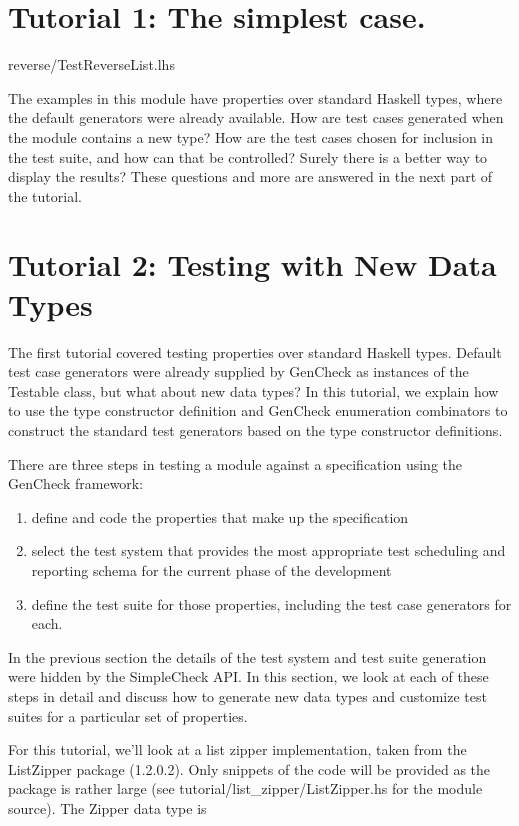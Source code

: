 \section{Tutorial 1: The simplest case.}

 {reverse/TestReverseList.lhs}

The examples in this module have properties over standard Haskell types, where
the default generators were already available.  How are test cases generated
when the module contains a new type?  How are the test cases chosen for
inclusion in the test suite, and how can that be controlled?  Surely there is
a better way to display the results?  These questions and more are answered
in the next part of the tutorial.  

\section{Tutorial 2: Testing with New Data Types}

The first tutorial covered testing properties over standard Haskell types.
Default test case generators were already supplied by GenCheck
as instances of the Testable class, but what about new data types?
In this tutorial, we explain how to use the type constructor definition and 
GenCheck enumeration combinators to construct the standard test generators
based on the type constructor definitions.

There are three steps in testing a module against 
a specification using the GenCheck framework:

\begin{enumerate}
\item define and code the properties that make up the specification
\item select the test system that provides the most appropriate
test scheduling and reporting schema for the current phase of the development
\item define the test suite for those properties,
including the test case generators for each.
\end{enumerate}

In the previous section the details of the test system
and test suite generation were hidden by the SimpleCheck API.
In this section, we look at each of these steps in detail 
and discuss how to generate new data types and customize test suites
for a particular set of properties.

For this tutorial, we'll look at a list zipper implementation,
taken from the ListZipper package (1.2.0.2).  Only snippets
of the code will be provided as the package is rather large
(see tutorial/list\_zipper/ListZipper.hs  for the module source).
The Zipper data type is

